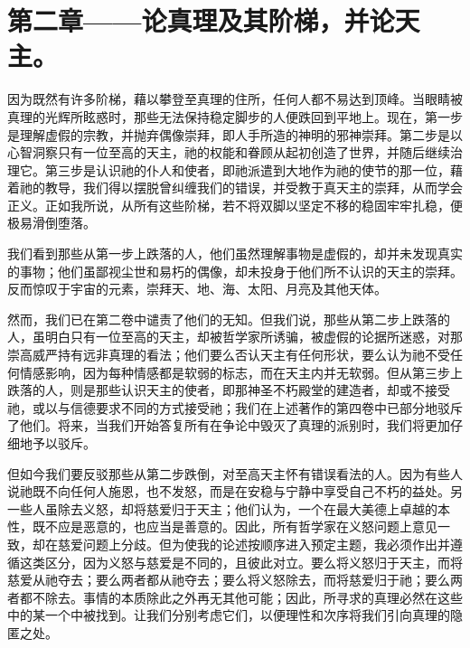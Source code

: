
\section{第二章——论真理及其阶梯，并论天主。}

因为既然有许多阶梯，藉以攀登至真理的住所，任何人都不易达到顶峰。当眼睛被真理的光辉所眩惑时，那些无法保持稳定脚步的人便跌回到平地上。现在，第一步是理解虚假的宗教，并抛弃偶像崇拜，即人手所造的神明的邪神崇拜。第二步是以心智洞察只有一位至高的天主，祂的权能和眷顾从起初创造了世界，并随后继续治理它。第三步是认识祂的仆人和使者，即祂派遣到大地作为祂的使节的那一位，藉着祂的教导，我们得以摆脱曾纠缠我们的错误，并受教于真天主的崇拜，从而学会正义。正如我所说，从所有这些阶梯，若不将双脚以坚定不移的稳固牢牢扎稳，便极易滑倒堕落。\par

我们看到那些从第一步上跌落的人，他们虽然理解事物是虚假的，却并未发现真实的事物；他们虽鄙视尘世和易朽的偶像，却未投身于他们所不认识的天主的崇拜。反而惊叹于宇宙的元素，崇拜天、地、海、太阳、月亮及其他天体。\par

然而，我们已在第二卷中谴责了他们的无知。但我们说，那些从第二步上跌落的人，虽明白只有一位至高的天主，却被哲学家所诱骗，被虚假的论据所迷惑，对那崇高威严持有远非真理的看法；他们要么否认天主有任何形状，要么认为祂不受任何情感影响，因为每种情感都是软弱的标志，而在天主内并无软弱。但从第三步上跌落的人，则是那些认识天主的使者，即那神圣不朽殿堂的建造者，却或不接受祂，或以与信德要求不同的方式接受祂；我们在上述著作的第四卷中已部分地驳斥了他们。将来，当我们开始答复所有在争论中毁灭了真理的派别时，我们将更加仔细地予以驳斥。\par

但如今我们要反驳那些从第二步跌倒，对至高天主怀有错误看法的人。因为有些人说祂既不向任何人施恩，也不发怒，而是在安稳与宁静中享受自己不朽的益处。另一些人虽除去义怒，却将慈爱归于天主；他们认为，一个在最大美德上卓越的本性，既不应是恶意的，也应当是善意的。因此，所有哲学家在义怒问题上意见一致，却在慈爱问题上分歧。但为使我的论述按顺序进入预定主题，我必须作出并遵循这类区分，因为义怒与慈爱是不同的，且彼此对立。要么将义怒归于天主，而将慈爱从祂夺去；要么两者都从祂夺去；要么将义怒除去，而将慈爱归于祂；要么两者都不除去。事情的本质除此之外再无其他可能；因此，所寻求的真理必然在这些中的某一个中被找到。让我们分别考虑它们，以便理性和次序将我们引向真理的隐匿之处。\par

